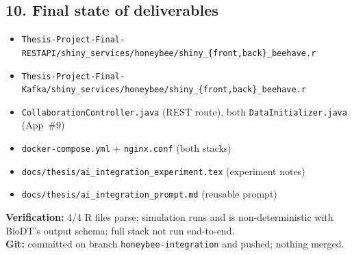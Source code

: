 \subsection*{10. Final state of deliverables}

\begin{itemize}
  \item \texttt{Thesis-Project-Final-RESTAPI/shiny\_services/honeybee/shiny\_\{front,back\}\_beehave.r}
  \item \texttt{Thesis-Project-Final-Kafka/shiny\_services/honeybee/shiny\_\{front,back\}\_beehave.r}
  \item \texttt{CollaborationController.java} (REST route), both
    \texttt{DataInitializer.java} (App~\#9)
  \item \texttt{docker-compose.yml} + \texttt{nginx.conf} (both stacks)
  \item \texttt{docs/thesis/ai\_integration\_experiment.tex} (experiment notes)
  \item \texttt{docs/thesis/ai\_integration\_prompt.md} (reusable prompt)
\end{itemize}

\noindent\textbf{Verification:} 4/4 R files parse; simulation runs and is
non-deterministic with BioDT's output schema; full stack not run end-to-end.\\
\textbf{Git:} committed on branch \texttt{honeybee-integration} and pushed;
nothing merged.
